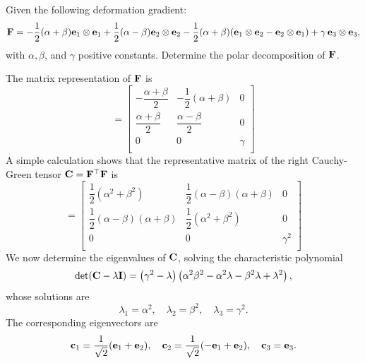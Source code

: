\begin{exercise}
	Given the following deformation gradient:
	\begin{equation}
		\mathbf{F} = -\frac{1}{2}(\alpha + \beta)\mathbf{e}_1 \otimes \mathbf{e}_1 + \frac{1}{2}(\alpha - \beta)\mathbf{e}_2 \otimes \mathbf{e}_2 - \frac12 (\alpha + \beta)(\mathbf{e}_1 \otimes \mathbf{e}_2 - \mathbf{e}_2 \otimes \mathbf{e}_1) + \gamma \,\mathbf{e}_3 \otimes \mathbf{e}_3,
	\end{equation}
	with $\alpha, \beta$, and $\gamma$ positive constants. Determine the polar decomposition of $\mathbf{F}$.
	\begin{svolgimento}
		The matrix representation of $\mathbf{F}$ is 
		\begin{equation}
			[\Fb]= \left[
			\begin{array}{ccc}
				-\dfrac{\alpha + \beta}{2} & -\dfrac{1}{2} (\alpha + \beta ) & 0 \\ [.2cm]
				\dfrac{\alpha + \beta}{2} & \dfrac{\alpha - \beta}{2} & 0 \\[.2cm]
				0 & 0 & \gamma  \\
			\end{array}
			\right]
		\end{equation}
		A simple calculation shows that the representative matrix of the right Cauchy-Green tensor $\mathbf{C} = \mathbf{F}^\top \mathbf{F}$ is
		\begin{equation}
			[\Cb]=\left[
			\begin{array}{ccc}
				\dfrac{1}{2} \left(\alpha^2 + \beta^2\right) & \dfrac{1}{2} (\alpha - \beta ) (\alpha + \beta ) & 0 \\[.2cm]
				\dfrac{1}{2} (\alpha - \beta ) (\alpha + \beta ) & \dfrac{1}{2} \left(\alpha^2 + \beta^2\right) & 0 \\[.2cm]
				0 & 0 & \gamma^2 \\
			\end{array}
			\right]
		\end{equation}
		We now determine the eigenvalues of $\mathbf{C}$, solving the characteristic polynomial
		\begin{equation}
			\det(\mathbf{C} - \lambda \mathbf{I}) = \left(\gamma^2 - \lambda \right) \left(\alpha^2 \beta^2 - \alpha^2 \lambda - \beta^2 \lambda + \lambda^2\right),
		\end{equation}
		whose solutions are
		\begin{equation}
			\lambda_1 = \alpha^2, \quad \lambda_2 = \beta^2, \quad \lambda_3 = \gamma^2.
		\end{equation}
		The corresponding eigenvectors are
		\begin{equation}
			\cb_1 = \frac{1}{\sqrt{2}}(\eb_1 + \eb_2), \quad \cb_2 = \frac{1}{\sqrt{2}}(-\eb_1 + \eb_2), \quad \cb_3 = \eb_3.

\end{equation}
\end{svolgimento}
\end{exercise}
